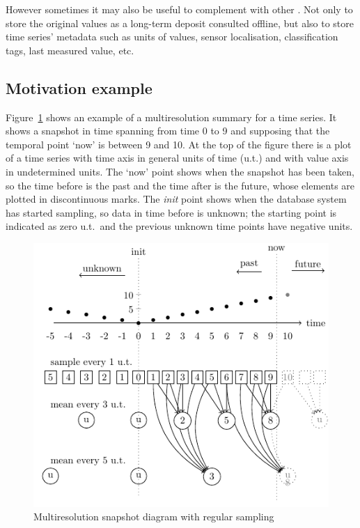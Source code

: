 However sometimes it may also be useful to complement 
with other . Not only to store the original values as a
long-term deposit consulted offline, but also to store time series'
metadata such as units of values, sensor localisation, classification
tags, last measured value, etc.



\subsection{Motivation example}

Figure~\ref{fig:mtsms:sequence} shows an example of a multiresolution
summary for a time series.  It shows a snapshot in time spanning from
time 0 to 9 and supposing that the temporal point `now' is between 9
and 10. At the top of the figure there is a plot of a time series with
time axis in general units of time (u.t.) and with value axis in
undetermined units. The `now' point shows when the snapshot has been
taken, so the time before is the past and the time after is the
future, whose elements are plotted in discontinuous marks. The
\emph{init} point shows when the database system has started sampling,
so data in time before is unknown; the starting point is indicated as
zero u.t.\ and the previous unknown time points have negative units.


\begin{figure}
  \centering
  \includegraphics{fig_mtsms_sequence.pdf}
  \caption{Multiresolution snapshot diagram with regular sampling}
  \label{fig:mtsms:sequence}
\end{figure}


